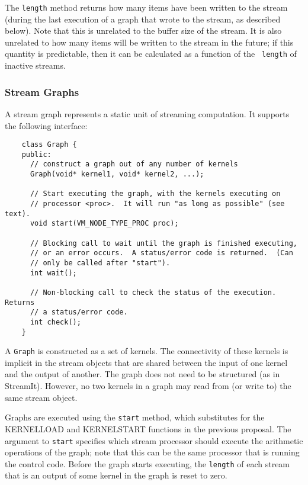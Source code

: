 The {\tt length} method returns how many items have been written to
the stream (during the last execution of a graph that wrote to the
stream, as described below).  Note that this is unrelated to the
buffer size of the stream.  It is also unrelated to how many items
will be written to the stream in the future; if this quantity is
predictable, then it can be calculated as a function of the {\tt
length} of inactive streams.

\subsubsection{Stream Graphs}
\label{sec:streamgraph}

A stream graph represents a static unit of streaming computation.  It
supports the following interface:
{\small
\begin{verbatim}
    class Graph {
    public:
      // construct a graph out of any number of kernels
      Graph(void* kernel1, void* kernel2, ...);

      // Start executing the graph, with the kernels executing on
      // processor <proc>.  It will run "as long as possible" (see text).
      void start(VM_NODE_TYPE_PROC proc);

      // Blocking call to wait until the graph is finished executing,
      // or an error occurs.  A status/error code is returned.  (Can 
      // only be called after "start").
      int wait();

      // Non-blocking call to check the status of the execution.  Returns
      // a status/error code.
      int check();
    }
\end{verbatim}}

A {\tt Graph} is constructed as a set of kernels.  The connectivity of
these kernels is implicit in the stream objects that are shared
between the input of one kernel and the output of another.  The graph
does not need to be structured (as in StreamIt).  However, no two
kernels in a graph may read from (or write to) the same stream object.

Graphs are executed using the {\tt start} method, which substitutes
for the KERNELLOAD and KERNELSTART functions in the previous proposal.
The argument to {\tt start} specifies which stream processor should
execute the arithmetic operations of the graph; note that this can be
the same processor that is running the control code.  Before the graph
starts executing, the {\tt length} of each stream that is an output of
some kernel in the graph is reset to zero.

